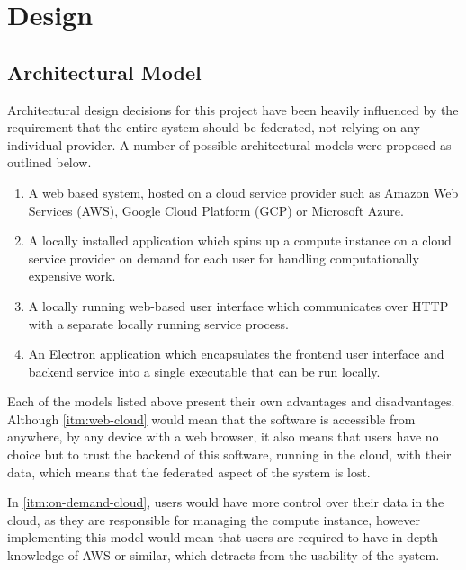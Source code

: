 \chapter{Design}


\section{Architectural Model}

Architectural design decisions for this project have been heavily influenced by the requirement that the entire system should be federated, not relying on any individual provider. A number of possible architectural models were proposed as outlined below.

\begin{enumerate}
  \item \label{itm:web-cloud} A web based system, hosted on a cloud service provider such as Amazon Web Services (AWS), Google Cloud Platform (GCP) or Microsoft Azure.
  \item \label{itm:on-demand-cloud} A locally installed application which spins up a compute instance on a cloud service provider on demand for each user for handling computationally expensive work.
  \item \label{itm:local-service} A locally running web-based user interface which communicates over HTTP with a separate locally running service process.
  \item \label{itm:electron} An Electron application which encapsulates the frontend user interface and backend service into a single executable that can be run locally.
\end{enumerate}

Each of the models listed above present their own advantages and disadvantages. Although \ref{itm:web-cloud} would mean that the software is accessible from anywhere, by any device with a web browser, it also means that users have no choice but to trust the backend of this software, running in the cloud, with their data, which means that the federated aspect of the system is lost.

In \ref{itm:on-demand-cloud}, users would have more control over their data in the cloud, as they are responsible for managing the compute instance, however implementing this model would mean that users are required to have in-depth knowledge of AWS or similar, which detracts from the usability of the system.

